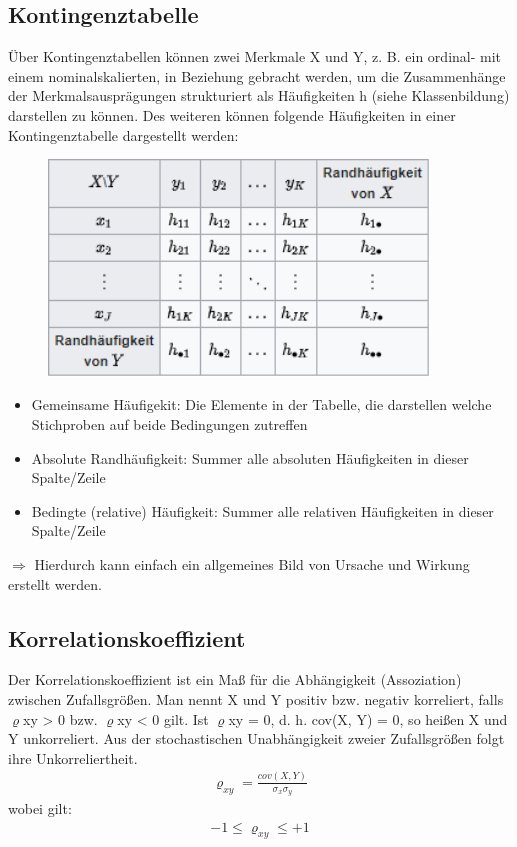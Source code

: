 \documentclass[a4paper,10pt]{scrartcl}
\begin{document}
\subsection{Kontingenztabelle}
Über Kontingenztabellen können zwei Merkmale X und Y, z. B. ein ordinal- mit einem nominalskalierten, in Beziehung gebracht werden, um die Zusammenhänge der Merkmalsausprägungen strukturiert als Häufigkeiten h (siehe Klassenbildung) darstellen zu können. Des weiteren können folgende Häufigkeiten in einer Kontingenztabelle dargestellt werden:
\begin{figure}[h] 
  \centering
    \includegraphics[width=0.9\textwidth]{Kontingenztabelle.PNG}
  \label{fig:Bild1}
\end{figure}
\begin{itemize}
    \item Gemeinsame Häufigekit: Die Elemente in der Tabelle, die darstellen welche Stichproben auf beide Bedingungen zutreffen
    \item Absolute Randhäufigkeit: Summer alle absoluten Häufigkeiten in dieser Spalte/Zeile
    \item Bedingte (relative) Häufigkeit: Summer alle relativen Häufigkeiten in dieser Spalte/Zeile
\end{itemize}
$\Rightarrow$ Hierdurch kann einfach ein allgemeines Bild von Ursache und Wirkung erstellt werden.
\subsection{Korrelationskoeffizient}
Der Korrelationskoeffizient ist ein Maß für die Abhängigkeit (Assoziation) zwischen Zufallsgrößen. Man nennt X und Y positiv bzw. negativ korreliert, falls $\varrho$xy > 0 bzw. $\varrho$xy < 0 gilt. Ist $\varrho$xy = 0, d. h. cov(X, Y) = 0, so heißen X und Y unkorreliert. Aus der stochastischen Unabhängigkeit zweier Zufallsgrößen folgt ihre Unkorreliertheit.
\begin{eqnarray}{\varrho }_{xy}=\frac{cov(X,Y)}{{\sigma }_{x}{\sigma }_{y}}\end{eqnarray} wobei gilt:
\begin{eqnarray}-1\le {\varrho}_{xy}\le +1\end{eqnarray}
\end{document}
